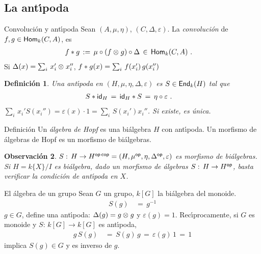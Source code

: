 \theoremstyle{plain}
\newtheorem{defAntipoda}{Definici\'{o}n}[section]
\newtheorem{obsHopf}[defAntipoda]{Observaci\'{o}n}
\newtheorem{teoGrupoDeMorfismos}[defAntipoda]{Teorema}


\subsection{La ant\'{\i}poda}

\begin{frame}{Convoluci\'{o}n y ant\'{\i}poda}
	Sean $(A,\mu,\eta)$, $(C,\Delta,\varepsilon)$. La
	\emph{convoluci\'{o}n} de $f,g\in\Hom[k](C,A)$, es
	\begin{align*}
		f \convol g & \,:=\,\mu\circ(f\tensor g)\circ\Delta
			\,\in\,\Hom[k](C,A)
		\text{ .}
	\end{align*}
	Si $\Delta(x)=\sum_i\,x_i'\tensor x_i''$,
	$f \convol g(x) =\sum_i\,f(x_i')\,g(x_i'')$
	\begin{defAntipoda}\label{def:antipoda}
		Una \emph{ant\'{\i}poda} en $(H,\mu,\eta,\Delta,\varepsilon)$
		es $S\in\Endo[k](H)$ tal que
		\begin{align*}
			S\convol\id[H] & \,=\,\id[H]\convol S \,=\,
				\eta\circ\varepsilon
			\text{ .}
		\end{align*}
		\begin{math}
			\sum_i\,x_i'S(x_i'')=\varepsilon(x)\cdot 1=
				\sum_i\,S(x_i')x_i''
		\end{math}. Si existe, es \'{u}nica.
	\end{defAntipoda}
\end{frame}

\begin{frame}{Definici\'{o}n}
	Un \emph{\'{a}lgebra de Hopf} es una bi\'{a}lgebra $H$ con
	ant\'{\i}poda. Un morfismo de \'{a}lgebras de Hopf es un morfismo de
	bi\'{a}lgebras.
	\begin{obsHopf}\label{obs:hopf}
		\begin{math}
			S:\,H\rightarrow H^{\opp\,\copp}=
				(H,\mu^\opp,\eta,\Delta^\opp,\varepsilon)
		\end{math} es morfismo de bi\'{a}lgebras.
		Si $H=k\{X\}/I$ es bi\'{a}lgebra, dado un morfismo de
		\'{a}lgebras $S:\,H\rightarrow H^\opp$, basta verificar la
		condici\'{o}n de ant\'{\i}poda en $X$.
	\end{obsHopf}
\end{frame}

\begin{frame}{El \'{a}lgebra de un grupo}
	Sean $G$ un grupo, $k[G]$ la bi\'{a}lgebra del monoide.
	\begin{align*}
		S(g) & \,=\,g^{-1}
	\end{align*}
	$g\in G$, define una ant\'{\i}poda: $\Delta(g)=g\tensor g$ y
	$\varepsilon(g)=1$. Rec\'{\i}procamente, si $G$ es monoide y
	$S:\,k[G]\rightarrow k[G]$ es ant\'{\i}poda,
	\begin{align*}
		g\,S(g) & \,=\,S(g)\,g \,=\,\varepsilon(g)\,1\,=\,1
	\end{align*}
	implica $S(g)\in G$ y es inverso de $g$.
\end{frame}

